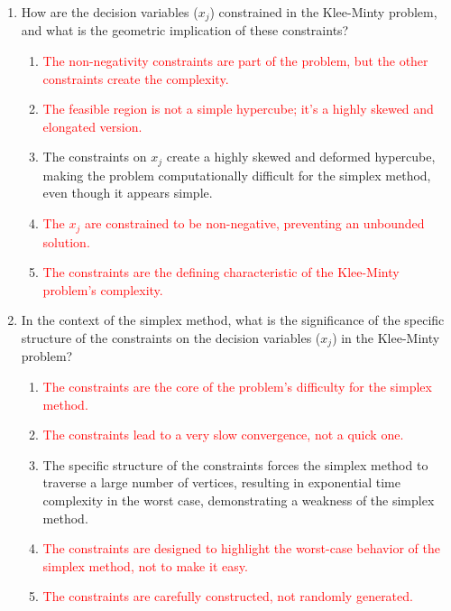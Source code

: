 \documentclass{article}%
\newcommand{\incorrect}[1]{\textcolor{red}{#1}}
\begin{document}
\begin{enumerate}
\begin{enumerate}
\begin{enumerate}
\item \incorrect{The $x_j$ are decision variables, not resource constraints.}%
\item \incorrect{The objective function is directly defined in terms of the decision variables $x_j$.}%
\end{enumerate}%
\vspace{0.5em}%
\item How are the decision variables ($x_j$) constrained in the Klee-Minty problem, and what is the geometric implication of these constraints?%
\begin{enumerate}%
\item \incorrect{The non-negativity constraints are part of the problem, but the other constraints create the complexity.}%
\item \incorrect{The feasible region is not a simple hypercube; it's a highly skewed and elongated version.}%
\item The constraints on $x_j$ create a highly skewed and deformed hypercube, making the problem computationally difficult for the simplex method, even though it appears simple.%
\item \incorrect{The $x_j$ are constrained to be non-negative, preventing an unbounded solution.}%
\item \incorrect{The constraints are the defining characteristic of the Klee-Minty problem's complexity.}%
\end{enumerate}%
\vspace{0.5em}%
\item In the context of the simplex method, what is the significance of the specific structure of the constraints on the decision variables ($x_j$) in the Klee-Minty problem?%
\begin{enumerate}%
\item \incorrect{The constraints are the core of the problem's difficulty for the simplex method.}%
\item \incorrect{The constraints lead to a very slow convergence, not a quick one.}%
\item The specific structure of the constraints forces the simplex method to traverse a large number of vertices, resulting in exponential time complexity in the worst case, demonstrating a weakness of the simplex method.%
\item \incorrect{The constraints are designed to highlight the worst-case behavior of the simplex method, not to make it easy.}%
\item \incorrect{The constraints are carefully constructed, not randomly generated.}%

\end{enumerate}
\end{enumerate}
\end{enumerate}
\end{document}
